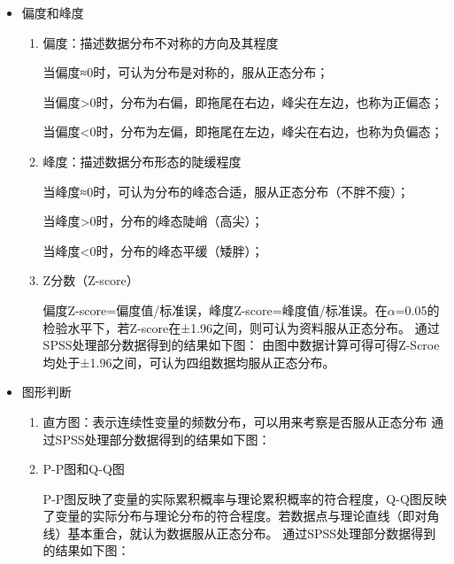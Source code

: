 \documentclass[UTF8]{ctexart}
\begin{document}
	\begin{itemize}
		\item 偏度和峰度
		\begin{enumerate}
			\item 偏度：描述数据分布不对称的方向及其程度
			
			当偏度≈0时，可认为分布是对称的，服从正态分布；
			
			当偏度>0时，分布为右偏，即拖尾在右边，峰尖在左边，也称为正偏态；
			
			当偏度<0时，分布为左偏，即拖尾在左边，峰尖在右边，也称为负偏态；
			
			\item 峰度：描述数据分布形态的陡缓程度
			
			当峰度≈0时，可认为分布的峰态合适，服从正态分布（不胖不瘦）；
			
			当峰度>0时，分布的峰态陡峭（高尖）；
			
			当峰度<0时，分布的峰态平缓（矮胖）；
			
			\item Z分数（Z-score） 
			
			偏度Z-score=偏度值/标准误，峰度Z-score=峰度值/标准误。在$\alpha$=0.05的检验水平下，若Z-score在±1.96之间，则可认为资料服从正态分布。
			通过SPSS处理部分数据得到的结果如下图：	
		由图中数据计算可得可得Z-Scroe均处于±1.96之间，可认为四组数据均服从正态分布。			
		\end{enumerate}
		\item 图形判断
		\begin{enumerate}
			\item 直方图：表示连续性变量的频数分布，可以用来考察是否服从正态分布
			通过SPSS处理部分数据得到的结果如下图：
			\item P-P图和Q-Q图
			
			P-P图反映了变量的实际累积概率与理论累积概率的符合程度，Q-Q图反映了变量的实际分布与理论分布的符合程度。若数据点与理论直线（即对角线）基本重合，就认为数据服从正态分布。
			通过SPSS处理部分数据得到的结果如下图：
			
		\end{enumerate}
	\end{itemize}
\end{document}
